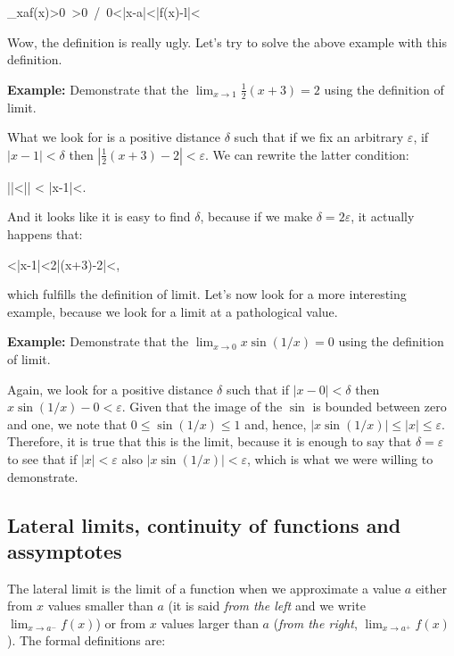 \bnn
\lim_{x\rightarrow a}f(x)\Leftrightarrow\forall\varepsilon>0\ \exists\delta>0\ /\ 0<|x-a|<\delta\Rightarrow |f(x)-l|<\varepsilon
\enn
\vs

Wow, the definition is really ugly. Let's try to solve the above example with this definition.

{\bf Example:} Demonstrate that the $\lim_{x\rightarrow 1} \frac{1}{2}(x+3)=2$ using the definition of limit.

What we look for is a positive distance $\delta$ such that if we fix an arbitrary $\varepsilon$, if $|x-1|<\delta$ then $ |\frac{1}{2}(x+3)-2|<\varepsilon$. We can rewrite the latter condition:

\bnn
 ||<\varepsilon \Rightarrow || < \varepsilon \Rightarrow |x-1|<\varepsilon.
\enn

And it looks like it is easy to find $\delta$, because if we make $\delta = 2\varepsilon$, it actually happens that:

<|x-1|<2\varepsilon \Rightarrow |(x+3)-2|<\varepsilon,
\enn

which fulfills the definition of limit. Let's now look for a more interesting example, because
we look for a limit at a pathological value.

{\bf Example:} Demonstrate that the $\lim_{x\rightarrow 0} x\sin(1/x)=0$ using the definition of limit.

Again, we look for a positive distance $\delta$ such that if $|x-0|<\delta$ then 
$x\sin(1/x)-0 < \varepsilon$. Given that the image of the $\sin$ is bounded between
zero and one, we note that $0 \leq \sin(1/x)\leq 1$ and, hence, $|x\sin(1/x)|\leq |x| \leq \varepsilon$. Therefore, it is true that this is the limit, because it is enough to say that
$\delta = \varepsilon$ to see that if $|x| < \varepsilon$ also $|x\sin(1/x)|<\varepsilon$,
which is what we were willing to demonstrate.

\subsection{Lateral limits, continuity of functions and assymptotes}

The lateral limit is the limit of a function when we approximate a value $a$ either from $x$ values smaller than $a$ (it is said \emph{from the left} and we write $\lim_{x\rightarrow a^{-}}f(x)$) or from $x$ values larger than $a$ (\emph{from the right}, $\lim_{x\rightarrow a^{+}}f(x)$). The
formal definitions are:

